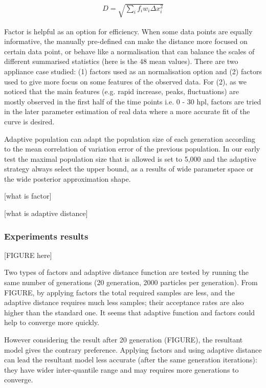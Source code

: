 \documentclass[12pt,a4paper]{report}
\begin{document}
\begin{align}
    \label{dis_f}
    D=\sqrt{\sum_i f_iw_i \Delta x_i^2}
\end{align}

Factor is helpful as an option for efficiency. When some data points are equally informative, the manually pre-defined can make the distance more focused on certain data point, or behave like a normalisation that can balance the scales of different summarised statistics (here is the 48 mean values). There are two appliance case studied: (1) factors used as an normalisation option and (2) factors used to give more focus on some features of the observed data. For (2), as we noticed that the main features (e.g. rapid increase, peaks, fluctuations) are mostly observed in the first half of the time points i.e. 0 - 30 hpl, factors are tried in the later parameter estimation of real data where a more accurate fit of the curve is desired.

Adaptive population \cite{ref:adpt_pop} can adapt the population size of each generation according to the mean correlation of variation error of the previous population. In our early test the maximal population size that is allowed is set to 5,000 and the adaptive strategy always select the upper bound, as a results of wide parameter space or the wide posterior approximation shape.

[what is factor]

[what is adaptive distance]

\subsubsection{Experiments results}

[FIGURE here]

Two types of factors and adaptive distance function are tested by running the same number of generations (20 generation, 2000 particles per generation). From FIGURE, by applying factors the total required samples are less, and the adaptive distance requires much less samples; their acceptance rates are also higher than the standard one. It seems that adaptive function and factors could help to converge more quickly.

However considering the result after 20 generation (FIGURE), the resultant model gives the contrary preference. Applying factors and using adaptive distance can lead the resultant model less accurate (after the same generation iterations): they have wider inter-quantile range and may requires more generations to converge.
\end{document}
